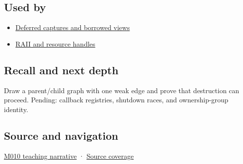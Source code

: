 \subsection{Used by}\label{appendix-b9548675eb2b-used-by}

\hypertarget{appendix-b9548675eb2b-used-by}{}

\begin{itemize}
\tightlist
\item
  \hyperref[appendix-aea529eb5175]{Deferred captures and borrowed views}
\item
  \hyperref[appendix-69739d3ab49b]{RAII and resource handles}
\end{itemize}

\subsection{Recall and next depth}\label{appendix-b9548675eb2b-recall-and-next-depth}

\hypertarget{appendix-b9548675eb2b-recall-and-next-depth}{}

Draw a parent/child graph with one weak edge and prove that destruction can proceed. Pending: callback registries, shutdown races, and ownership-group identity.

\subsection{Source and navigation}\label{appendix-b9548675eb2b-source-and-navigation}

\hypertarget{appendix-b9548675eb2b-source-and-navigation}{}

\hyperref[01-foundations-i-ch004-weak-observation-breaks-cycles-without-pretending-an-object-is-alive]{M010 teaching narrative} · \hyperref[appendix-fd090d982a15-m010---parts-148-160]{Source coverage}
